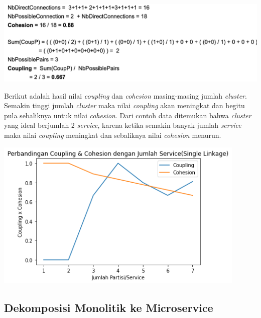 \begin{center}
	\includegraphics[width=14cm]{img/bab_3/eval_detail2.png}
	\label{fig:asd}
\end{center}

Berikut adalah hasil nilai \textit{coupling} dan \textit{cohesion} masing-masing jumlah \textit{cluster}. Semakin tinggi jumlah \textit{cluster} maka nilai \textit{coupling} akan meningkat dan begitu pula sebaliknya untuk nilai \textit{cohesion}. Dari contoh data ditemukan bahwa \textit{cluster} yang ideal berjumlah 2 \textit{service}, karena ketika semakin banyak jumlah \textit{service} maka nilai \textit{coupling} meningkat dan sebaliknya nilai \textit{cohesion} menurun.


\begin{center}
	\includegraphics[width=12cm]{img/bab_3/cohVScoup_single.png}
	\label{fig:asd}
\end{center}

\pagebreak

\subsection{Dekomposisi Monolitik ke Microservice}
